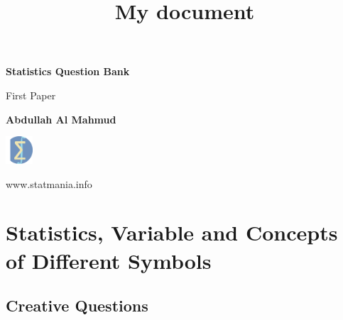 \documentclass[a4paper,oneside]{book}
\title{My document}
\begin{document}
\frontmatter

\begin{titlepage}
    \begin{center}
        \vspace*{1cm}
            
        \Huge
        \textbf{Statistics Question Bank}
            
        \vspace{0.5cm}
        \LARGE
        First Paper
            
        \vspace{1.5cm}
            
        \textbf{Abdullah Al Mahmud}
            
        \vfill
            
            
        \vspace{0.8cm}
            
 \includegraphics[width=1cm]{logo}
 
        \Large
        www.statmania.info\\
            
    \end{center}
\end{titlepage}

\tableofcontents


\mainmatter

\chapter{Statistics, Variable and Concepts of Different Symbols} 

\section{Creative Questions}
\end{document}

